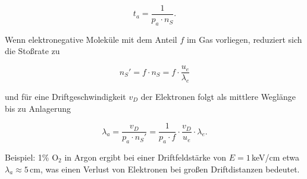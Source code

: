 \[t_a=\frac{1}{p_a\cdot n_S}  .\]

Wenn elektronegative Moleküle mit dem Anteil $f$ im Gas vorliegen, reduziert sich die Stoßrate zu

\[n_S' = f\cdot n_S = f\cdot \frac{u_e}{\lambda_e} \]

und für eine Driftgeschwindigkeit $v_D$ der Elektronen folgt als mittlere Weglänge bis zu Anlagerung

\[\lambda_a = \frac{v_D}{p_a\cdot n_S'}=\frac{1}{p_a\cdot f}\cdot \frac{v_D}{u_e}\cdot \lambda_e  
.\]

Beispiel: 1\% O$_2$ in Argon ergibt bei einer Driftfeldstärke von $E=1\,$keV/cm etwa
$\lambda_a\approx5\,$cm, was einen Verlust von Elektronen bei großen Driftdistanzen bedeutet.
